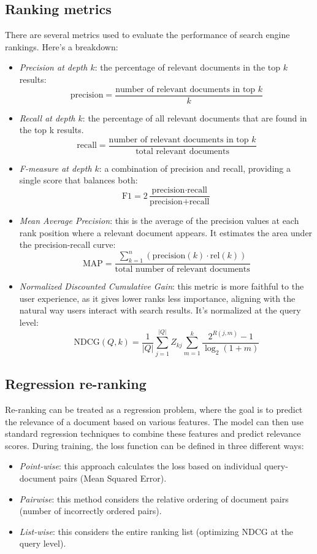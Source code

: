 \subsection{Ranking metrics}
There are several metrics used to evaluate the performance of search engine rankings. 
Here's a breakdown:
\begin{itemize}
    \item \textit{Precision at depth $k$}: the percentage of relevant documents in the top $k$ results: 
        \[\text{precision}=\dfrac{\text{number of relevant documents in top }k}{k}\]
    \item \textit{Recall at depth $k$}: the percentage of all relevant documents that are found in the top k results.
        \[\text{recall}=\dfrac{\text{number of relevant documents in top }k}{\text{total relevant documents}}\]
    \item \textit{F-measure at depth $k$}: a combination of precision and recall, providing a single score that balances both: 
        \[\text{F1}=2\dfrac{\text{precision}\cdot\text{recall}}{\text{precision}+\text{recall}}\]
    \item \textit{Mean Average Precision}: this is the average of the precision values at each rank position where a relevant document appears. 
        It estimates the area under the precision-recall curve: 
        \[\text{MAP}=\dfrac{\sum_{k=1}^n(\text{precision}(k)\cdot\text{rel}(k))}{\text{total number of relevant documents}}\]
    \item \textit{Normalized Discounted Cumulative Gain}: this metric is more faithful to the user experience, as it gives lower ranks less importance, aligning with the natural way users interact with search results. 
        It's normalized at the query level:
        \[\text{NDCG}(Q,k)=\dfrac{1}{\left\lvert Q \right\rvert}\sum_{j=1}^{\left\lvert Q \right\rvert}Z_{kj}\sum_{m=1}^k\dfrac{2^{R(j,m)}-1}{\log_2(1+m)}\]
\end{itemize}

\subsection{Regression re-ranking}
Re-ranking can be treated as a regression problem, where the goal is to predict the relevance of a document based on various features. 
The model can then use standard regression techniques to combine these features and predict relevance scores.
During training, the loss function can be defined in three different ways:
\begin{itemize}
    \item \textit{Point-wise}: this approach calculates the loss based on individual query-document pairs (Mean Squared Error).
    \item \textit{Pairwise}: this method considers the relative ordering of document pairs (number of incorrectly ordered pairs).
    \item \textit{List-wise}: this considers the entire ranking list (optimizing NDCG at the query level).
\end{itemize}